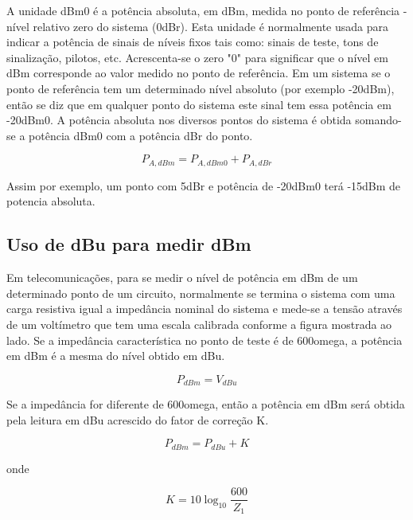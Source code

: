 \documentclass[
	article,			%
	11pt,				%
	oneside,			%
	a4paper,			%
	english,			%
	brazil,				%
	sumario=tradicional
	]{abntex2}
\begin{document}
    A unidade dBm0 é a potência absoluta, em dBm, medida no ponto de
referência - nível relativo zero do sistema (0dBr). Esta unidade é
normalmente usada para indicar a potência de sinais de níveis fixos tais
como: sinais de teste, tons de sinalização, pilotos, etc. Acrescenta-se o
zero "0" para significar que o nível em dBm corresponde ao valor
medido no ponto de referência.
Em um sistema se o ponto de referência tem um determinado nível
absoluto (por exemplo -20dBm), então se diz que em qualquer ponto do
sistema este sinal tem essa potência em -20dBm0. A potência absoluta
nos diversos pontos do sistema é obtida somando-se a potência dBm0
com a potência dBr do ponto. 



    \begin{equation}
        {\displaystyle P_{A,dBm}} =  {\displaystyle P_{A,dBm0}} +  {\displaystyle P_{A,dBr}}
    \end{equation}
    
Assim por exemplo, um ponto com 5dBr e potência de -20dBm0 terá
-15dBm de potencia absoluta. 

\subsection{Uso de dBu para medir dBm}

Em telecomunicações, para se medir o nível de
potência em dBm de um determinado ponto de um
circuito, normalmente se termina o sistema com
uma carga resistiva igual a impedância nominal do
sistema e mede-se a tensão através de um
voltímetro que tem uma escala calibrada conforme a figura mostrada ao
lado. Se a impedância característica no ponto de teste é de 600omega, a
potência em dBm é a mesma do nível obtido em dBu.

\begin{equation}
        {\displaystyle P_{dBm}} = {\displaystyle V_{dBu}} 
    \end{equation}

Se a impedância for diferente de 600omega, então a potência em dBm será
obtida pela leitura em dBu acrescido do fator de correção K.

\begin{equation}
    {\displaystyle P_{dBm}} = {\displaystyle P_{dBu}} + K
\end{equation}

onde

\begin{equation}
    K = 10\log_{10}\frac{600}{ {\displaystyle Z_{1}}}
\end{equation}
\end{document}
